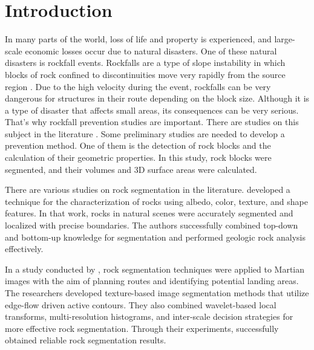 \documentclass[a4paper,fleqn]{cas-sc}
\begin{document}
\maketitle 

\printcredits

\doublespacing


\section{Introduction}
\label{intro}
In many parts of the world, loss of life and property is experienced, and large-scale economic losses occur due to natural disasters. One of these natural disasters is rockfall events. Rockfalls are a type of slope instability in which blocks of rock confined to discontinuities move very rapidly from the source region \citep{varnes1978slope, hutchinson1988morphological, CrudenVarnes1996}. Due to the high velocity during the event, rockfalls can be very dangerous for structures in their route depending on the block size. Although it is a type of disaster that affects small areas, its consequences can be very serious. That's why rockfall prevention studies are important. There are studies on this subject in the literature \citep{liu2021trajectory, keskin2022kinematic,ji2023assessment,kainthola2023stability, cao2024risk}. Some preliminary studies are needed to develop a prevention method. One of them is the detection of rock blocks and the calculation of their geometric properties. In this study, rock blocks were segmented, and their volumes and 3D surface areas were calculated. 

There are various studies on rock segmentation in the literature. \cite{dunlop2006automatic} developed a technique for the characterization of rocks using albedo, color, texture, and shape features. In that work, rocks in natural scenes were accurately segmented and localized with precise boundaries. The authors successfully combined top-down and bottom-up knowledge for segmentation and performed geologic rock analysis effectively.

In a study conducted by \cite{Song2006AFF}, rock segmentation techniques were applied to Martian images with the aim of planning routes and identifying potential landing areas. The researchers developed texture-based image segmentation methods that utilize edge-flow driven active contours. They also combined wavelet-based local transforms, multi-resolution histograms, and inter-scale decision strategies for more effective rock segmentation. Through their experiments, \cite{Song2006AFF} successfully obtained reliable rock segmentation results.
\end{document}
